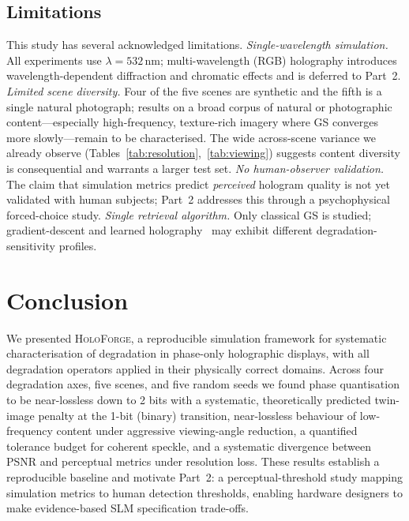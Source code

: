 \documentclass[conference]{IEEEtran}
\begin{document}
\subsection{Limitations}
This study has several acknowledged limitations.
\textit{Single-wavelength simulation.} All experiments use $\lambda=532\,\text{nm}$;
multi-wavelength (RGB) holography introduces wavelength-dependent diffraction and
chromatic effects and is deferred to Part~2.
\textit{Limited scene diversity.} Four of the five scenes are synthetic and the
fifth is a single natural photograph; results on a broad corpus of natural or
photographic content---especially high-frequency, texture-rich imagery where GS
converges more slowly---remain to be characterised. The wide across-scene
variance we already observe (Tables~\ref{tab:resolution},~\ref{tab:viewing})
suggests content diversity is consequential and warrants a larger test set.
\textit{No human-observer validation.} The claim that simulation metrics predict
\emph{perceived} hologram quality is not yet validated with human subjects; Part~2
addresses this through a psychophysical forced-choice study.
\textit{Single retrieval algorithm.} Only classical GS is studied;
gradient-descent and learned holography~\cite{shi2021towards,
chakravarthula2019wirtinger} may exhibit different degradation-sensitivity
profiles.

\section{Conclusion}
\label{sec:conclusion}
We presented \textsc{HoloForge}, a reproducible simulation framework for
systematic characterisation of degradation in phase-only holographic displays,
with all degradation operators applied in their physically correct domains.
Across four degradation axes, five scenes, and five random seeds we found phase
quantisation to be near-lossless down to 2 bits with a systematic, theoretically
predicted twin-image penalty at the 1-bit (binary) transition, near-lossless
behaviour of low-frequency content under aggressive viewing-angle reduction, a
quantified tolerance budget for coherent speckle, and a systematic divergence
between PSNR and perceptual metrics under resolution loss. These results establish a reproducible baseline and
motivate Part~2: a perceptual-threshold study mapping simulation metrics to human
detection thresholds, enabling hardware designers to make evidence-based SLM
specification trade-offs.
\end{document}
